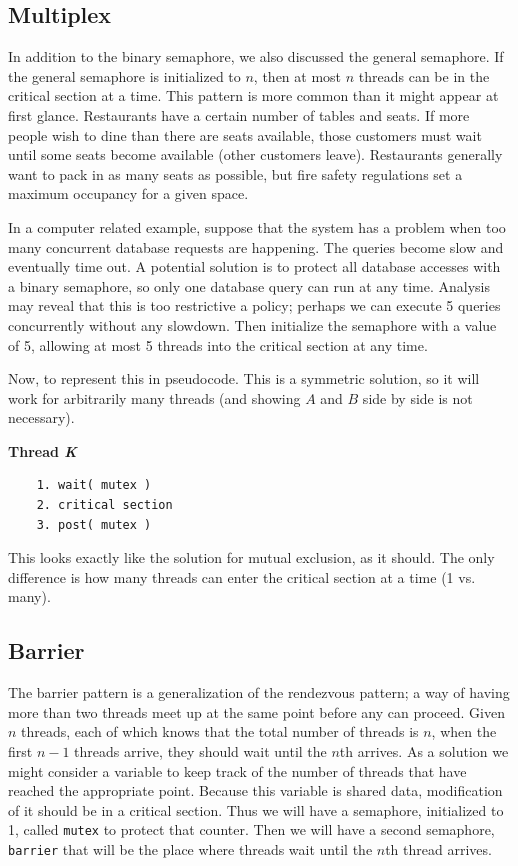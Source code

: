 \subsection*{Multiplex}
In addition to the binary semaphore, we also discussed the general semaphore. If the general semaphore is initialized to $n$, then at most $n$ threads can be in the critical section at a time. This pattern is more common than it might appear at first glance. Restaurants have a certain number of tables and seats. If more people wish to dine than there are seats available, those customers must wait until some seats become available (other customers leave). Restaurants generally want to pack in as many seats as possible, but fire safety regulations set a maximum occupancy for a given space.

In a computer related example, suppose that the system has a problem when too many concurrent database requests are happening. The queries become slow and eventually time out. A potential solution is to protect all database accesses with a binary semaphore, so only one database query can run at any time. Analysis may reveal that this is too restrictive a policy; perhaps we can execute 5 queries concurrently without any slowdown. Then initialize the semaphore with a value of 5, allowing at most 5 threads into the critical section at any time.

Now, to represent this in pseudocode. This is a symmetric solution, so it will work for arbitrarily many threads (and showing $A$ and $B$ side by side is not necessary).

\textbf{Thread \textit{K}}\vspace{-2em}
\begin{verbatim}
	1. wait( mutex )
	2. critical section
	3. post( mutex )
  \end{verbatim}
\vspace{-2em}

This looks exactly like the solution for mutual exclusion, as it should. The only difference is how many threads can enter the critical section at a time (1 vs. many).


\subsection*{Barrier}
The barrier pattern is a generalization of the rendezvous pattern; a way of having more than two threads meet up at the same point before any can proceed. Given $n$ threads, each of which knows that the total number of threads is $n$, when the first $n-1$ threads arrive, they should wait until the $n$th arrives. As a solution we might consider a variable to keep track of the number of threads that have reached the appropriate point. Because this variable is shared data, modification of it should be in a critical section.  Thus we will have a semaphore, initialized to 1, called \texttt{mutex} to protect that counter. Then we will have a second semaphore, \texttt{barrier} that will be the place where threads wait until the $n$th thread arrives.


